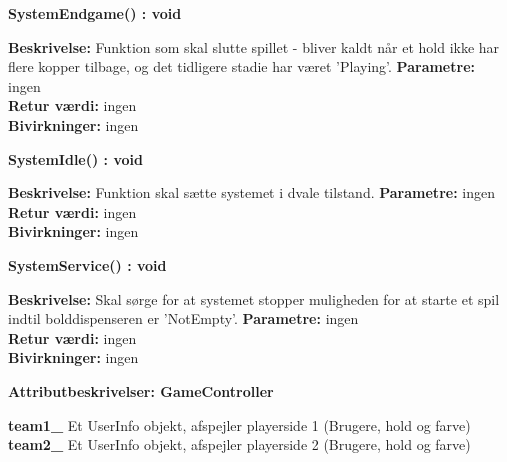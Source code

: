 \documentclass[Arkitektur/System_main.tex]{subfiles}
\begin{document}
\textbf{SystemEndgame() : void}
\begin{adjustwidth}{1cm}{0pt}
\textbf{Beskrivelse:} Funktion som skal slutte spillet - bliver kaldt når et hold ikke har flere kopper tilbage, og det tidligere stadie har været 'Playing'.
\textbf{Parametre:} ingen \\[0.2cm]
\textbf{Retur værdi:} ingen \\[0.2cm]
\textbf{Bivirkninger:} ingen \\[0.2cm]
\end{adjustwidth}

\textbf{SystemIdle() : void}
\begin{adjustwidth}{1cm}{0pt}
\textbf{Beskrivelse:} Funktion skal sætte systemet i dvale tilstand. 
\textbf{Parametre:} ingen \\[0.2cm]
\textbf{Retur værdi:} ingen \\[0.2cm]
\textbf{Bivirkninger:} ingen \\[0.2cm]
\end{adjustwidth}

\textbf{SystemService() : void}
\begin{adjustwidth}{1cm}{0pt}
\textbf{Beskrivelse:} Skal sørge for at systemet stopper muligheden for at starte et spil indtil bolddispenseren er 'NotEmpty'. 
\textbf{Parametre:} ingen \\[0.2cm]
\textbf{Retur værdi:} ingen \\[0.2cm]
\textbf{Bivirkninger:} ingen \\[0.2cm]
\end{adjustwidth}

{\large\textbf{Attributbeskrivelser: GameController}}
\begin{adjustwidth}{1cm}{0pt}
\textbf{team1\_} Et UserInfo objekt, afspejler playerside 1 (Brugere, hold og farve) \\[0.2cm]
\textbf{team2\_} Et UserInfo objekt, afspejler playerside 2 (Brugere, hold og farve) \\[0.2cm]
\end{adjustwidth}
\end{document}
